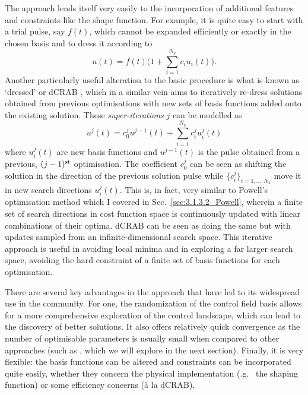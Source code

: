The  approach lends itself very easily to the incorporation of additional features and constraints like the shape function. For example, it is quite easy to start with a trial pulse, say $f(t)$, which cannot be expanded efficiently or exactly in the chosen basis and to dress it according to
\begin{equation}\label{eq:trial_pulse_CRAB}
    u(t) = f(t)\Bigg(1 + \sum_{i = 1}^{N_k} c_i u_i(t)\Bigg).
\end{equation}
Another particularly useful alteration to the basic  procedure is what is known as `dressed'  or dCRAB \cite{rach_dressing_2015}, which in a similar vein aims to iteratively re-dress solutions obtained from previous optimisations with new sets of basis functions added onto the existing solution. These \emph{super-iterations} $j$ can be modelled as
\begin{equation}\label{eq:dCRAB}
    u^j(t) = c_0^j u^{j-1}(t) + \sum_{i = 1}^{N_k} c_i^j u^j_i(t)
\end{equation}
where $u^j_i(t)$ are new basis functions and $u^{j-1}(t)$ is the pulse obtained from a previous, $(j-1)^{\rm st}$ optimisation. The coefficient $c_0^j$ can be seen as shifting the solution in the direction of the previous solution pulse while $\{ c_i^j\}_{i = 1, ..., N_k}$ move it in new search directions $u^j_i(t)$. This is, in fact, very similar to Powell's optimisation method which I covered in Sec.~\ref{sec:3.1.3.2_Powell}, wherein a finite set of search directions in cost function space is continuously updated with linear combinations of their optima. dCRAB can be seen as doing the same but with updates sampled from an infinite-dimensional search space. This iterative approach is useful in  avoiding local minima and in exploring a far larger search space, avoiding the hard constraint of a finite set of basis functions for each optimisation. 

There are several key advantages in the  approach that have led to its widespread use in the  community. For one, the randomization of the control field basis allows for a more comprehensive exploration of the control landscape, which can lead to the discovery of better solutions. It also offers relatively quick convergence as the number of optimisable parameters is usually small when compared to other approaches (such as , which we will explore in the next section). Finally, it is very flexible: the basis functions can be altered and constraints can be incorporated quite easily, whether they concern the physical implementation (\@e.g.~ the shaping function) or some efficiency concerns (à la dCRAB).

